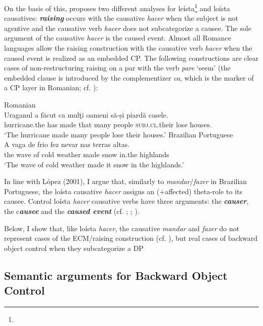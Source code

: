 \documentclass[output=paper]{langsci/langscibook}
\begin{document}
On the basis of this, \citet{Torrego2010} proposes two different analyses for leísta\footnote{} and loísta causatives: \textbf{\textit{raising}} occurs with the causative \textit{hacer} when the subject is not agentive and the causative verb \textit{hacer} does not subcategorize a causee. The sole argument of the causative \textit{hacer} is the caused event. Almost all Romance languages allow the raising construction with the causative verb \textit{hacer} when the caused event is realized as an embedded CP. The following constructions are clear cases of non-restructuring raising on a par with the verb \textit{pare} ‘seem’ (the embedded clause is introduced by the complementizer \textit{ca}, which is the marker of a CP layer in Romanian; cf. \citealt{Alboiu2007}):

\ea%
    \label{ex:moreno:8}
    \ea  Romanian\\
    \gll Uraganul    a    făcut   ca   mulţi  oameni  să-și              piardă casele.   \\
         hurricane.the has made  that many people   \textsc{subj.cl}.their lose     houses. \\
    \glt ‘The hurricane made many people lose their houses.’
    \ex  Brazilian Portuguese\\
    \gll A   vaga  de frio     fez   nevar   nas     terras altas.  \\
         the wave of cold weather   made  snow  in.the highlands\\
    \glt ‘The wave of cold weather made it snow in the highlands.’ 
    \z
\z

In line with López (2001), I argue that, similarly to \textit{mandar}/\textit{fazer} in Brazilian Portuguese, the loísta causative \textit{hacer} assigns an (+affected) theta-role to its causee. Control loísta \textit{hacer} causative verbs have three arguments: the \textbf{\textit{causer}}, the c\textbf{\textit{ausee} }and the \textbf{\textit{caused event}} (cf. \citealt{Zubizarreta1985}; \citealt{Alsina1992}; \citealt{Ippolito2000}). 

Below, I show that, like loísta \textit{hacer}, the causative \textit{mandar} and \textit{fazer} do not represent cases of the ECM/raising construction (cf. \citealt{Farrell1995}), but real cases of backward object control when they subcategorize a DP

\subsection{Semantic arguments for Backward Object Control} %
\end{document}
